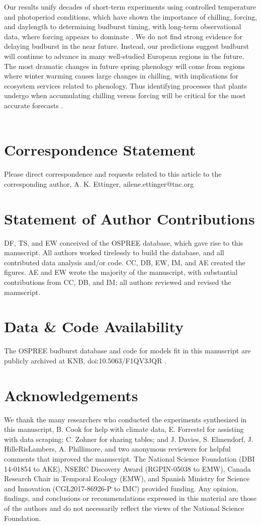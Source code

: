 \documentclass{article}
\begin{document}
 \par Our results unify decades of short-term experiments using controlled temperature and photoperiod conditions, which have shown the importance of chilling, forcing, and daylength to determining budburst timing, with long-term observational data, where forcing appears to dominate \emph{\citep[e.g.,][]{roberts2015}}. We do not find strong evidence for delaying budburst in the near future. Instead, our predictions suggest budburst will continue to advance in many well-studied European regions in the future. The most dramatic changes in future spring phenology will come from regions where winter warming causes large changes in chilling, with implications for ecosystem services related to phenology. Thus identifying processes that plants undergo when accumulating chilling versus forcing will be critical for the most accurate forecasts \emph{\citep{chuine2016,Singh:2017}}. \\
 \\
\section*{Correspondence Statement}
Please direct correspondence and requests related to this article to the corresponding author, A. K. Ettinger, ailene.ettinger@tnc.org\\
\section*{Statement of Author Contributions} 
DF, TS, and EW conceived of the OSPREE database, which gave rise to this manuscript. All authors worked tirelessly to build the database, and all contributed data analysis and/or code. CC, DB, EW, IM, and AE created the figures. AE and EW wrote the majority of the manuscript, with substantial contributions from CC, DB, and IM; all authors reviewed and revised the manuscript. 

\section*{Data \& Code Availability} 
The OSPREE budburst database and code for models fit in this manuscript are publicly archived at KNB, doi:10.5063/F1QV3JQR \citep{wolkovich2019}.

\section*{Acknowledgements}
We thank the many researchers who conducted the experiments synthesized in this manuscript, B. Cook for help with climate data, E. Forrestel for assisting with data scraping; C. Zohner for sharing tables; and J. Davies, S. Elmendorf, J. HilleRisLambers, A. Phillimore, and two anonymous reviewers for helpful comments that improved the manuscript. The National Science Foundation (DBI 14-01854 to AKE), NSERC Discovery Award (RGPIN-05038 to EMW), Canada Research Chair in Temporal Ecology (EMW), and Spanish Ministry for Science and Innovation (CGL2017-86926-P to IMC) provided funding. Any opinion, findings, and conclusions or recommendations expressed in this material are those of the authors and do not necessarily reflect the views of the National Science Foundation.
\end{document}
